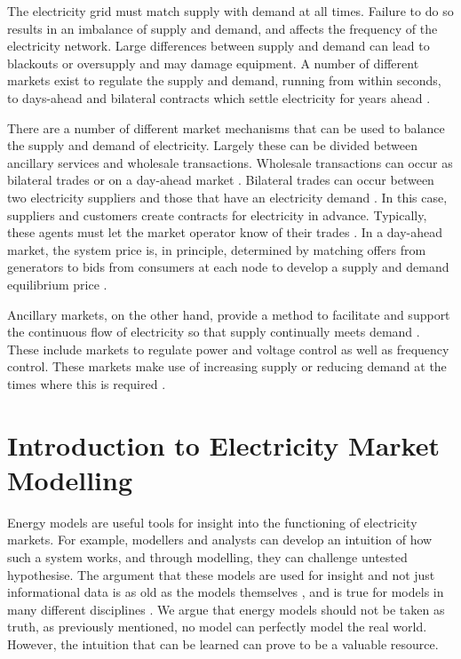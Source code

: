 The electricity grid must match supply with demand at all times. Failure to do so results in an imbalance of supply and demand, and affects the frequency of the electricity network. Large differences between supply and demand can lead to blackouts or oversupply and may damage equipment. A number of different markets exist to regulate the supply and demand, running from within seconds, to days-ahead and bilateral contracts which settle electricity for years ahead \cite{conejo2010electricity}.

There are a number of different market mechanisms that can be used to balance the supply and demand of electricity. Largely these can be divided between ancillary services and wholesale transactions. Wholesale transactions can occur as bilateral trades or on a day-ahead market \cite{conejo2010electricity}. Bilateral trades can occur between two electricity suppliers and those that have an electricity demand \cite{conejo2010electricity}. In this case, suppliers and customers create contracts for electricity in advance. Typically, these agents must let the market operator know of their trades \cite{conejo2010electricity}. In a day-ahead market, the system price is, in principle, determined by matching offers from generators to bids from consumers at each node to develop a supply and demand equilibrium price \cite{conejo2010electricity}. 

Ancillary markets, on the other hand, provide a method to facilitate and support the continuous flow of electricity so that supply continually meets demand \cite{conejo2010electricity}. These include markets to regulate power and voltage control as well as frequency control. These markets make use of increasing supply or reducing demand at the times where this is required \cite{conejo2010electricity}. 







\section{Introduction to Electricity Market Modelling}
\label{sec:intro:elecmarketsmodelling}


Energy models are useful tools for insight into the functioning of electricity markets. For example, modellers and analysts can develop an intuition of how such a system works, and through modelling, they can challenge untested hypothesise. The argument that these models are used for insight and not just informational data is as old as the models themselves \cite{Huntington1982, Pfenninger2014}, and is true for models in many different disciplines \cite{Geoffrion1976}. We argue that energy models should not be taken as truth, as previously mentioned, no model can perfectly model the real world. However, the intuition that can be learned can prove to be a valuable resource.

